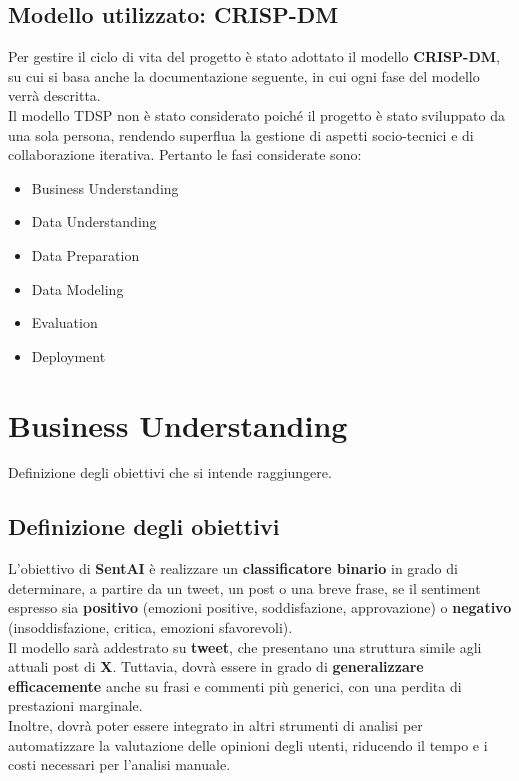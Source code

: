 \documentclass[12pt,a4paper]{report} %
\begin{document}
\section{Modello utilizzato: CRISP-DM}
Per gestire il ciclo di vita del progetto è stato adottato il modello \textbf{CRISP-DM}, su cui si basa anche la documentazione seguente, in cui ogni fase del modello verrà descritta. \\Il modello TDSP non è stato considerato poiché il progetto è stato sviluppato da una sola persona, rendendo superflua la gestione di aspetti socio-tecnici e di collaborazione iterativa.
Pertanto le fasi considerate sono:
\begin{itemize}
    \item Business Understanding
    \item Data Understanding 
    \item Data Preparation
    \item Data Modeling 
    \item Evaluation
    \item Deployment
\end{itemize}

\chapter{Business Understanding}
Definizione degli obiettivi che si intende raggiungere.
\section{Definizione degli obiettivi}
L'obiettivo di \textbf{SentAI} è realizzare un \textbf{classificatore binario} in grado di determinare, a partire da un tweet, un post o una breve frase, se il sentiment espresso sia \textbf{positivo} (emozioni positive, soddisfazione, approvazione) o \textbf{negativo }(insoddisfazione, critica, emozioni sfavorevoli).
\\Il modello sarà addestrato su \textbf{tweet}, che presentano una struttura simile agli attuali post di \textbf{X}. Tuttavia, dovrà essere in grado di \textbf{generalizzare efficacemente} anche su frasi e commenti più generici, con una perdita di prestazioni marginale. 
\\Inoltre, dovrà poter essere integrato in altri strumenti di analisi per automatizzare la valutazione delle opinioni degli utenti, riducendo il tempo e i costi necessari per l'analisi manuale. 
\end{document}
